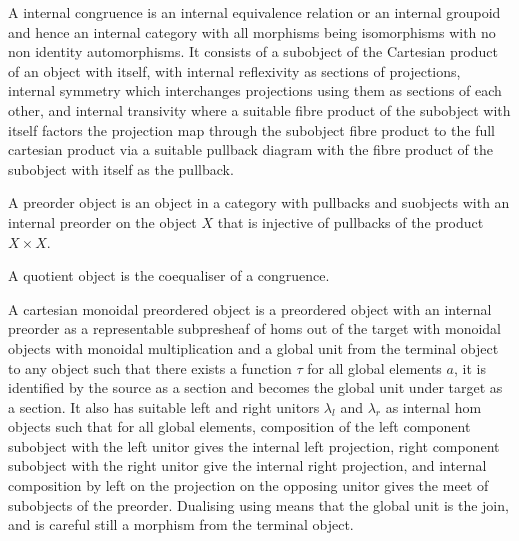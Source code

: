 \begin{definition}
    \label{definition-internal-congruence}
    A internal congruence is an internal equivalence relation or an internal groupoid and hence an internal category with all morphisms being isomorphisms with no non identity automorphisms. It consists of a subobject of the Cartesian product of an object with itself, with internal reflexivity as sections of projections, internal symmetry which interchanges projections using them as sections of each other, and internal transivity where a suitable fibre product of the subobject with itself factors the projection map through the subobject fibre product to the full cartesian product via a suitable pullback diagram with the fibre product of the subobject with itself as the pullback.
\end{definition}

\begin{definition}
    \label{definition-preorder-object}
    A preorder object is an object in a category with pullbacks and suobjects with an internal preorder on the object $X$ that is injective  of pullbacks of the product $X \times X$.
\end{definition}

\begin{definition}
    \label{definition-quotient-object}
    A quotient object is the coequaliser of a congruence.
\end{definition}

\begin{definition}
    \label{definition-cartesian-monoidal-preordered-object}
    A cartesian monoidal preordered object is a preordered object with an internal preorder as a representable subpresheaf of homs out of the target with monoidal objects with monoidal multiplication and a global unit from the terminal object to any object such that there exists a function $\tau$ for all global elements $a$, it is identified by the source as a section and becomes the global unit under target as a section. It also has suitable left and right unitors $\lambda_l$ and $\lambda_r$ as internal hom objects such that for all global elements, composition of the left component subobject with the left unitor gives the internal left projection, right component subobject with the right unitor give the internal right projection, and internal composition by left on the projection on the opposing unitor gives the meet of subobjects of the preorder. Dualising using means that the global unit is the join, and is careful still a morphism from the terminal object.
\end{definition}

